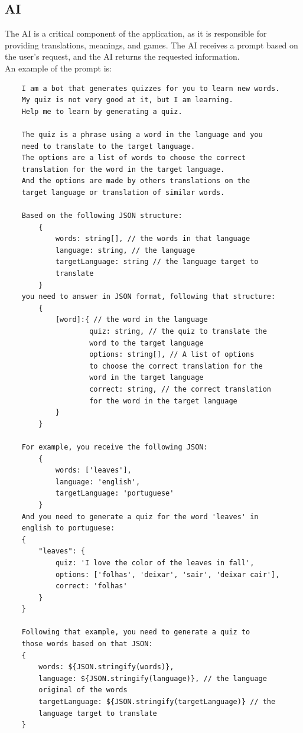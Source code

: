 \documentclass[12pt]{article}
\begin{document}
\subsection{AI}
  The AI is a critical component of the application, as it is responsible for providing translations, meanings, and games. The AI receives a prompt based on the user's request, and the AI returns the requested information. \\
  An example of the prompt is: \\
  \begin{verbatim}
    I am a bot that generates quizzes for you to learn new words.
    My quiz is not very good at it, but I am learning.
    Help me to learn by generating a quiz.

    The quiz is a phrase using a word in the language and you 
    need to translate to the target language.
    The options are a list of words to choose the correct 
    translation for the word in the target language. 
    And the options are made by others translations on the 
    target language or translation of similar words.
    
    Based on the following JSON structure:
        {
            words: string[], // the words in that language
            language: string, // the language 
            targetLanguage: string // the language target to 
            translate
        }
    you need to answer in JSON format, following that structure:
        {
            [word]:{ // the word in the language
                    quiz: string, // the quiz to translate the 
                    word to the target language
                    options: string[], // A list of options 
                    to choose the correct translation for the 
                    word in the target language
                    correct: string, // the correct translation 
                    for the word in the target language
            }
        }

    For example, you receive the following JSON:
        {
            words: ['leaves'],
            language: 'english', 
            targetLanguage: 'portuguese'
        }
    And you need to generate a quiz for the word 'leaves' in 
    english to portuguese:
    {
        "leaves": {
            quiz: 'I love the color of the leaves in fall',
            options: ['folhas', 'deixar', 'sair', 'deixar cair'],
            correct: 'folhas'
        }
    } 

    Following that example, you need to generate a quiz to 
    those words based on that JSON:
    {
        words: ${JSON.stringify(words)},
        language: ${JSON.stringify(language)}, // the language 
        original of the words
        targetLanguage: ${JSON.stringify(targetLanguage)} // the 
        language target to translate
    }
  \end{verbatim}
\end{document}
